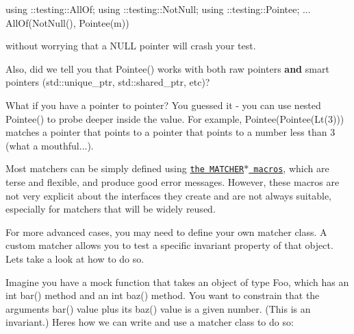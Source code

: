 \begin{DoxyCode}
using ::testing::AllOf;
using ::testing::NotNull;
using ::testing::Pointee;
...
  AllOf(NotNull(), Pointee(m))
\end{DoxyCode}


without worrying that a {\ttfamily N\+U\+LL} pointer will crash your test.

Also, did we tell you that {\ttfamily Pointee()} works with both raw pointers {\bfseries and} smart pointers ({\ttfamily std\+::unique\+\_\+ptr}, {\ttfamily std\+::shared\+\_\+ptr}, etc)?

What if you have a pointer to pointer? You guessed it -\/ you can use nested {\ttfamily Pointee()} to probe deeper inside the value. For example, {\ttfamily Pointee(Pointee(\+Lt(3)))} matches a pointer that points to a pointer that points to a number less than 3 (what a mouthful...).

Most matchers can be simply defined using \href{#NewMatchers}{\tt the M\+A\+T\+C\+H\+E\+R$\ast$ macros}, which are terse and flexible, and produce good error messages. However, these macros are not very explicit about the interfaces they create and are not always suitable, especially for matchers that will be widely reused.

For more advanced cases, you may need to define your own matcher class. A custom matcher allows you to test a specific invariant property of that object. Let\textquotesingle{}s take a look at how to do so.

Imagine you have a mock function that takes an object of type {\ttfamily Foo}, which has an {\ttfamily int bar()} method and an {\ttfamily int baz()} method. You want to constrain that the argument\textquotesingle{}s {\ttfamily bar()} value plus its {\ttfamily baz()} value is a given number. (This is an invariant.) Here\textquotesingle{}s how we can write and use a matcher class to do so\+:


